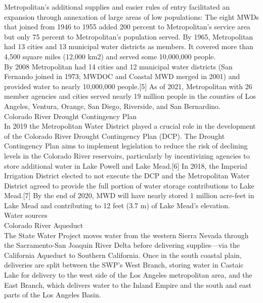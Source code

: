 \documentclass{article}
\begin{document}
Metropolitan's additional supplies and easier rules of entry facilitated an expansion through annexation of large areas of low populations: The eight MWDs that joined from 1946 to 1955 added 200 percent to Metropolitan's service area but only 75 percent to Metropolitan's population served.  By 1965, Metropolitan had 13 cities and 13 municipal water districts as members. It covered more than 4,500 square miles (12,000 km2) and served some 10,000,000 people.\\

By 2008 Metropolitan had 14 cities and 12 municipal water districts (San Fernando joined in 1973; MWDOC and Coastal MWD merged in 2001) and provided water to nearly 10,000,000 people.[5] As of 2021, Metropolitan with 26 member agencies and cities served nearly 19 million people in the counties of Los Angeles, Ventura, Orange, San Diego, Riverside, and San Bernardino.\\

Colorado River Drought Contingency Plan\\
In 2019 the Metropolitan Water District played a crucial role in the development of the Colorado River Drought Contingency Plan (DCP). The Drought Contingency Plan aims to implement legislation to reduce the risk of declining levels in the Colorado River reservoirs, particularly by incentivizing agencies to store additional water in Lake Powell and Lake Mead.[6] In 2018, the Imperial Irrigation District elected to not execute the DCP and the Metropolitan Water District agreed to provide the full portion of water storage contributions to Lake Mead.[7] By the end of 2020, MWD will have nearly stored 1 million acre-feet in Lake Mead and contributing to 12 feet (3.7 m) of Lake Mead's elevation.\\

Water sources\\

Colorado River Aqueduct\\
The State Water Project moves water from the western Sierra Nevada through the Sacramento-San Joaquin River Delta before delivering supplies—via the California Aqueduct to Southern California. Once in the south coastal plain, deliveries are split between the SWP's West Branch, storing water in Castaic Lake for delivery to the west side of the Los Angeles metropolitan area, and the East Branch, which delivers water to the Inland Empire and the south and east parts of the Los Angeles Basin.\\
\end{document}
